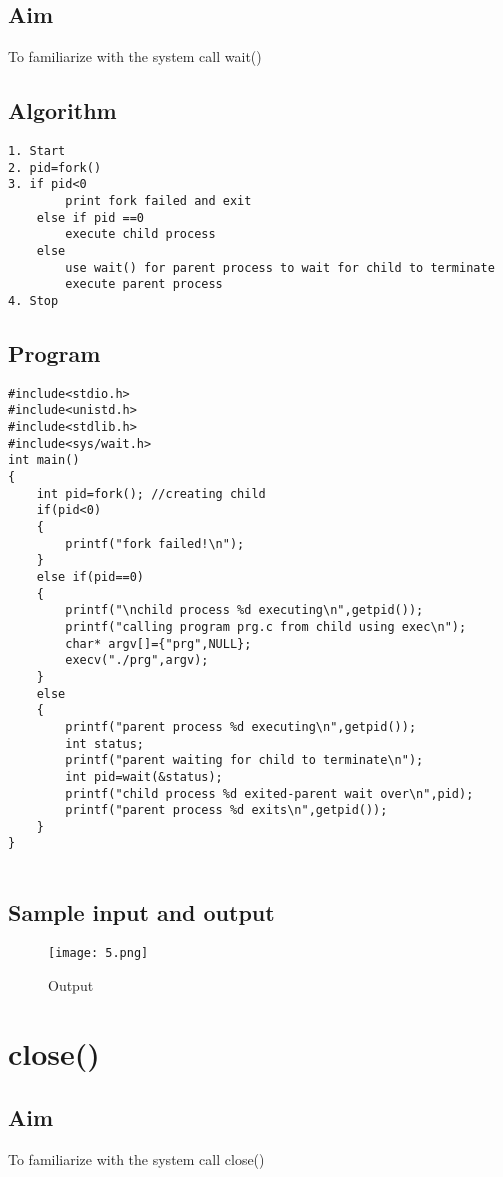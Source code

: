 \documentclass{article}
\begin{document}
\subsection{Aim}
To familiarize with the system call wait()
\subsection{Algorithm}
\begin{Verbatim}[tabsize = 4]
1. Start
2. pid=fork()
3. if pid<0 
        print fork failed and exit
    else if pid ==0
        execute child process
    else
        use wait() for parent process to wait for child to terminate
        execute parent process
4. Stop

\end{Verbatim}
\subsection{Program}
\begin{Verbatim}[tabsize = 4]
#include<stdio.h>
#include<unistd.h>
#include<stdlib.h>
#include<sys/wait.h>
int main()
{
    int pid=fork(); //creating child
    if(pid<0)
    {
        printf("fork failed!\n");
    }
    else if(pid==0)
    {
        printf("\nchild process %d executing\n",getpid());
        printf("calling program prg.c from child using exec\n");
        char* argv[]={"prg",NULL};
        execv("./prg",argv);
    }
    else
    {
        printf("parent process %d executing\n",getpid());
        int status;
        printf("parent waiting for child to terminate\n");
        int pid=wait(&status);
        printf("child process %d exited-parent wait over\n",pid);
        printf("parent process %d exits\n",getpid());
    }
}


\end{Verbatim}
\thispagestyle{third}
\subsection{Sample input and output}
\begin{figure}[H]
    \centering
    \texttt{[image: 5.png]}
    \caption{Output}
    \label{fig:my_label2}
\end{figure}

\section{\Large close()}
\subsection{Aim}
To familiarize with the system call close()
\end{document}
